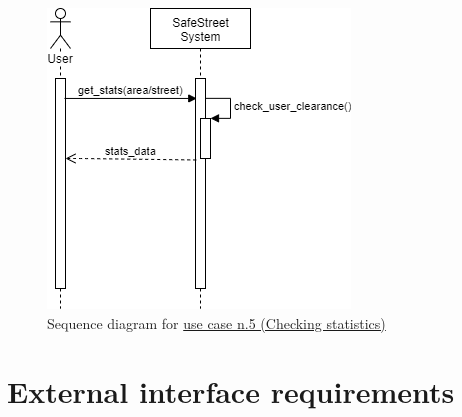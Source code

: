 \documentclass[a4paper]{report}
\begin{document}
\begin{figure}[htp]
\centering
\includegraphics[scale=0.7]{SequenceCheckStatistics}
\caption{Sequence diagram for \hyperref[uc:5]{use case n.5 (Checking statistics)} }
\label{fig:seq-checkstats}
\end{figure}



\section{External interface requirements}
\end{document}
